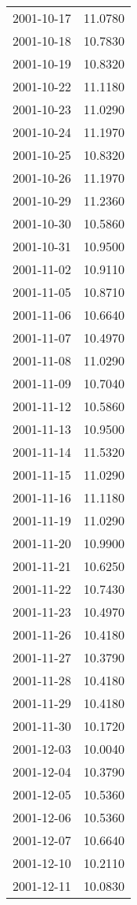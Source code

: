 \begin{tabular}{lr}
2001-10-17 &     11.0780 \\
2001-10-18 &     10.7830 \\
2001-10-19 &     10.8320 \\
2001-10-22 &     11.1180 \\
2001-10-23 &     11.0290 \\
2001-10-24 &     11.1970 \\
2001-10-25 &     10.8320 \\
2001-10-26 &     11.1970 \\
2001-10-29 &     11.2360 \\
2001-10-30 &     10.5860 \\
2001-10-31 &     10.9500 \\
2001-11-02 &     10.9110 \\
2001-11-05 &     10.8710 \\
2001-11-06 &     10.6640 \\
2001-11-07 &     10.4970 \\
2001-11-08 &     11.0290 \\
2001-11-09 &     10.7040 \\
2001-11-12 &     10.5860 \\
2001-11-13 &     10.9500 \\
2001-11-14 &     11.5320 \\
2001-11-15 &     11.0290 \\
2001-11-16 &     11.1180 \\
2001-11-19 &     11.0290 \\
2001-11-20 &     10.9900 \\
2001-11-21 &     10.6250 \\
2001-11-22 &     10.7430 \\
2001-11-23 &     10.4970 \\
2001-11-26 &     10.4180 \\
2001-11-27 &     10.3790 \\
2001-11-28 &     10.4180 \\
2001-11-29 &     10.4180 \\
2001-11-30 &     10.1720 \\
2001-12-03 &     10.0040 \\
2001-12-04 &     10.3790 \\
2001-12-05 &     10.5360 \\
2001-12-06 &     10.5360 \\
2001-12-07 &     10.6640 \\
2001-12-10 &     10.2110 \\
2001-12-11 &     10.0830 \\

\end{tabular}

